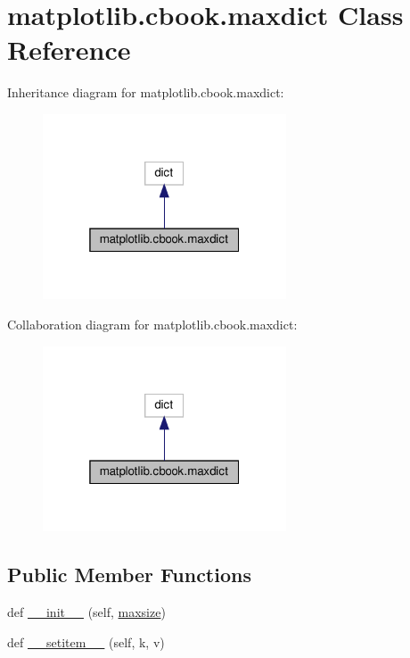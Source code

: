 \hypertarget{classmatplotlib_1_1cbook_1_1maxdict}{}\section{matplotlib.\+cbook.\+maxdict Class Reference}
\label{classmatplotlib_1_1cbook_1_1maxdict}


Inheritance diagram for matplotlib.\+cbook.\+maxdict\+:
\nopagebreak
\begin{figure}[H]
\begin{center}
\leavevmode
\includegraphics[width=205pt]{classmatplotlib_1_1cbook_1_1maxdict__inherit__graph}
\end{center}
\end{figure}


Collaboration diagram for matplotlib.\+cbook.\+maxdict\+:
\nopagebreak
\begin{figure}[H]
\begin{center}
\leavevmode
\includegraphics[width=205pt]{classmatplotlib_1_1cbook_1_1maxdict__coll__graph}
\end{center}
\end{figure}
\subsection*{Public Member Functions}
\begin{DoxyCompactItemize}
\item 
def \hyperlink{classmatplotlib_1_1cbook_1_1maxdict_aacb5a85ee341bce15bd2f381051e57d2}{\+\_\+\+\_\+init\+\_\+\+\_\+} (self, \hyperlink{classmatplotlib_1_1cbook_1_1maxdict_aa4b1f94140adaf6e8833aca516b3e297}{maxsize})
\item 
def \hyperlink{classmatplotlib_1_1cbook_1_1maxdict_aabaea7e2e7cb78361365d3d9530af979}{\+\_\+\+\_\+setitem\+\_\+\+\_\+} (self, k, v)
\end{DoxyCompactItemize}
